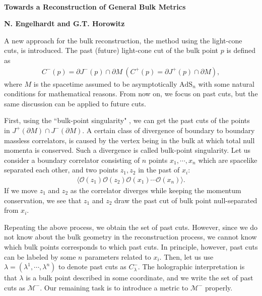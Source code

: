 \documentclass[12pt]{article}
\date{}
\begin{document}
{\Large{}\\[2mm]
\textbf{Towards a Reconstruction of General Bulk Metrics\cite{Engelhardt:2016wgb}
}
}

\noindent
\hfill
\textbf{N. Engelhardt and G.T. Horowitz}%

\vspace{12pt}
A new approach for the bulk reconstruction, the method using the light-cone cuts, is introduced.
The past (future) light-cone cut of the bulk point $p$ is defined as
\begin{align}
	C^-(p) = \partial J^-(p)\cap \partial M~(C^+(p) = \partial J^+(p)\cap \partial M),
\end{align}
where $M$ is the spacetime assumed to be asymptotically $\mathrm{AdS}_n$ with some natural conditions 
for mathematical reasons.
From now on, we focus on past cuts, but the same discussion can be applied to future cuts.

First, using the ``bulk-point singularity" \cite{Maldacena:2015iua}, we can get the past cuts of the points 
in $J^+(\partial M)\cap J^-(\partial M)$.
A certain class of divergence of boundary to boundary massless correlators,
is caused by the vertex being in the bulk at which total null momenta is conserved.
Such a divergence is called bulk-point singularity.
Let us consider a boundary correlator consisting of $n$ points $x_1,\cdots,x_n$ which are spacelike separated each other, 
and two points $z_1, z_2$ in the past of $x_i$:
\begin{align}
	\langle\mathcal O(z_1)\mathcal O(z_2)\mathcal O(x_1)\cdots\mathcal O(x_n)\rangle.
\end{align}
If we move $z_1$ and $z_2$ as the correlator diverges while keeping the momentum conservation,
we see that $z_1$ and $z_2$ draw the past cut of bulk point null-separated from $x_i$.

Repeating the above process, we obtain the set of past cuts.
However, since we do not know about the bulk geometry in the reconstruction process,
we cannot know which bulk points corresponds to which past cuts.
In principle, however, past cuts can be labeled by some $n$ parameters related to $x_i$.
Then, let us use $\lambda = (\lambda^1,\cdots,\lambda^n)$ to denote past cuts as $C^-_\lambda$.
The holographic interpretation is that $\lambda$ is a bulk point described in some coordinate,
and we write the set of past cuts as $\mathcal M^-$.
Our remaining task is to introduce a metric to $\mathcal M^-$ properly.
\end{document}
